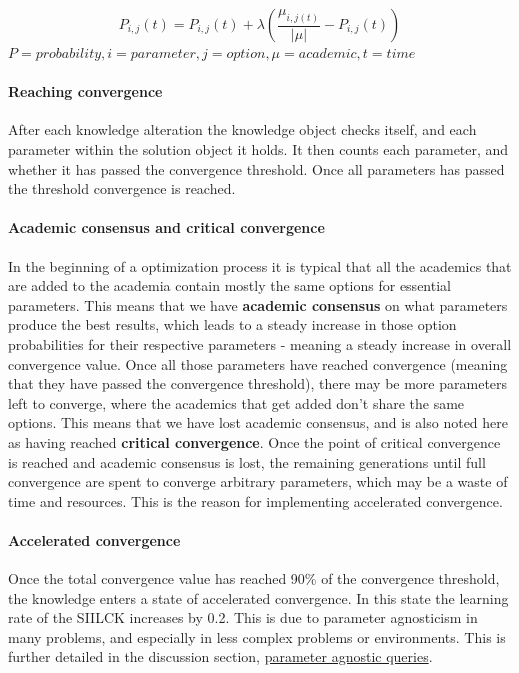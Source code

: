 \documentclass[a4paper,english]{report}
\begin{document}
		\begin{equation}\label{math:probability_vector}
		P_{i,j}(t) = P_{i,j}(t)+\lambda\left(\frac{\mu_{i,j(t)}}{|\mu|}-P_{i,j}(t)\right)
		\end{equation}
		{\centering
		\begin{math}
		P = probability, i = parameter, j = option, \mu = academic, t = time
		\end{math}\\
		}
		\paragraph{Reaching convergence}
		After each knowledge alteration the knowledge object checks itself, and each parameter within the solution object it holds. It then counts each parameter, and whether it has passed the convergence threshold. Once all parameters has passed the threshold convergence is reached.
		
		\paragraph{Academic consensus and critical convergence}
		In the beginning of a optimization process it is typical that all the academics that are added to the academia contain mostly the same options for essential parameters. This means that we have \textbf{academic consensus} on what parameters produce the best results, which leads to a steady increase in those option probabilities for their respective parameters - meaning a steady increase in overall convergence value. Once all those parameters have reached convergence (meaning that they have passed the convergence threshold), there may be more parameters left to converge, where the academics that get added don't share the same options. This means that we have lost academic consensus, and is also noted here as having reached \textbf{critical convergence}. Once the point of critical convergence is reached and academic consensus is lost, the remaining generations until full convergence are spent to converge arbitrary parameters, which may be a waste of time and resources. This is the reason for implementing accelerated convergence.
				
		\paragraph{Accelerated convergence}
		\label{sec:aggres}
		Once the total convergence value has reached 90\% of the convergence threshold, the knowledge enters a state of accelerated convergence. In this state the learning rate of the SIILCK increases by 0.2. This is due to parameter agnosticism in many problems, and especially in less complex problems or environments. This is further detailed in the discussion section, \hyperref[sec:param_agno]{parameter agnostic queries}.
		
\end{document}
